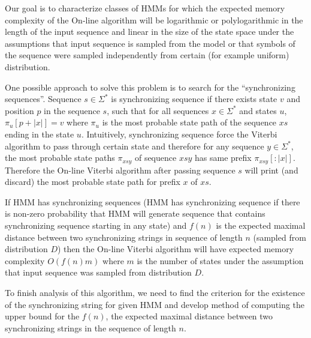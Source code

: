 Our goal is to characterize classes of HMMs for which  the expected memory
complexity of the On-line algorithm will be logarithmic or polylogarithmic in
the length of the input sequence and linear in the size of the state space
under the assumptions that input sequence is sampled from the model or that
symbols of the sequence were sampled independently from certain (for example
uniform) distribution.


One possible approach to solve this problem is to search for the ``synchronizing
sequences''.  
Sequence $s\in\Sigma^*$ is synchronizing sequence if there exists
state $v$ and position $p$ in the sequence $s$, such that for all sequences
$x\in \Sigma^*$ and states $u$, $\pi_u[{p+|x|}]=v$ where $\pi_u$ is the
most probable state path of the sequence $xs$ ending
in the state $u$. Intuitively, synchronizing sequence force the Viterbi algorithm
to pass through certain state and therefore for any sequence $y\in \Sigma^*$,
the most probable state paths $\pi_{xsy}$ of sequence $xsy$ has same prefix
$\pi_{xsy}[:|x|]$. Therefore the On-line Viterbi algorithm after passing
sequence $s$ will print (and discard) the most probable state path for prefix
$x$ of $xs$. 

If HMM has synchronizing sequences (HMM has synchronizing sequence if there is
non-zero probability that HMM will generate sequence that contains synchronizing
sequence starting in any state) and $f(n)$ is the expected maximal distance
between two synchronizing strings in sequence of length $n$ (sampled from
distribution $D$) then the On-line Viterbi algorithm will have expected memory
complexity $O(f(n)m)$ where $m$ is the number of states under the assumption
that input sequence was sampled from distribution $D$. 

To finish analysis of this algorithm, we need to find the criterion for the
existence of the synchronizing string for given HMM and develop method of
computing the upper bound for the $f(n)$, the expected maximal distance between
two synchronizing strings in the sequence of length $n$.


